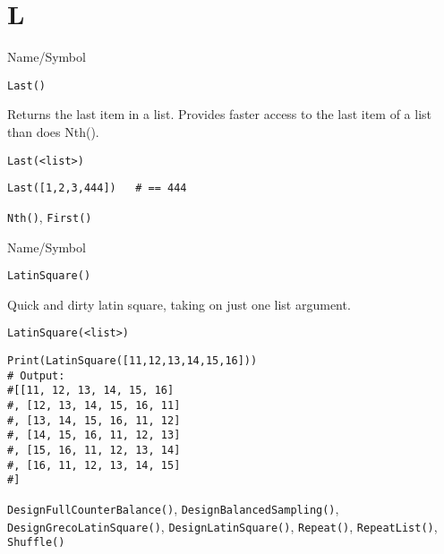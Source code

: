 \section{L}
\rl

\begin{desc}{Name/Symbol}
\item[Name/Symbol]	\verb+Last()+

\item[Description]	Returns the last item in a list. Provides faster 
		access to the last item of a list than does Nth().

\item[Usage]
\begin{verbatim}
Last(<list>)
\end{verbatim}

\item[Example]
\begin{verbatim}
Last([1,2,3,444])	# == 444
\end{verbatim}

\item[See Also]	\verb+Nth()+, \verb+First()+
\end{desc}

\rl





\begin{desc}{Name/Symbol}
\item[Name/Symbol]	\verb+LatinSquare()+

\item[Description]	Quick and dirty latin square, taking on just one
  list argument.

\item[Usage]
\begin{verbatim}
LatinSquare(<list>)
\end{verbatim}

\item[Example]
\begin{verbatim}
Print(LatinSquare([11,12,13,14,15,16]))
# Output:
#[[11, 12, 13, 14, 15, 16]
#, [12, 13, 14, 15, 16, 11]
#, [13, 14, 15, 16, 11, 12]
#, [14, 15, 16, 11, 12, 13]
#, [15, 16, 11, 12, 13, 14]
#, [16, 11, 12, 13, 14, 15]
#]

\end{verbatim}

\item[See Also] \verb+DesignFullCounterBalance()+,
  \verb+DesignBalancedSampling()+, \verb+DesignGrecoLatinSquare()+,
  \verb+DesignLatinSquare()+, \verb+Repeat()+, \verb+RepeatList()+,
  \verb+Shuffle()+

\end{desc}

